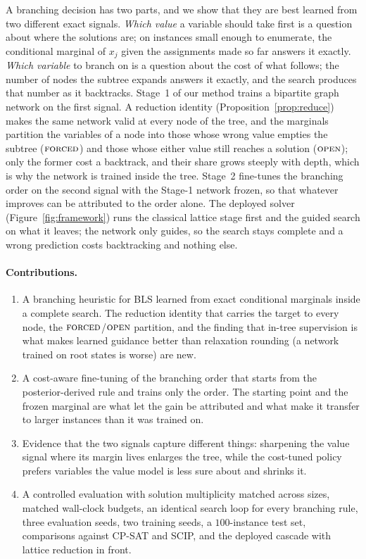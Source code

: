 \documentclass[final,5p,times,twocolumn,authoryear]{elsarticle}
\newcommand{\FORCED}{\textsc{forced}}
\newcommand{\FREE}{\textsc{open}}
\begin{document}
A branching decision has two parts, and we show that they are best learned from two different exact signals. \emph{Which value} a variable should take first is a question about where the solutions are; on instances small enough to enumerate, the conditional marginal of $x_j$ given the assignments made so far answers it exactly. \emph{Which variable} to branch on is a question about the cost of what follows; the number of nodes the subtree expands answers it exactly, and the search produces that number as it backtracks. Stage~1 of our method trains a bipartite graph network on the first signal. A reduction identity (Proposition~\ref{prop:reduce}) makes the same network valid at every node of the tree, and the marginals partition the variables of a node into those whose wrong value empties the subtree ($\FORCED$) and those whose either value still reaches a solution ($\FREE$); only the former cost a backtrack, and their share grows steeply with depth, which is why the network is trained inside the tree. Stage~2 fine-tunes the branching order on the second signal with the Stage-1 network frozen, so that whatever improves can be attributed to the order alone. The deployed solver (Figure~\ref{fig:framework}) runs the classical lattice stage first and the guided search on what it leaves; the network only guides, so the search stays complete and a wrong prediction costs backtracking and nothing else.

\paragraph{Contributions.}
\begin{enumerate}
\item A branching heuristic for BLS learned from exact conditional marginals inside a complete search. The reduction identity that carries the target to every node, the $\FORCED$/$\FREE$ partition, and the finding that in-tree supervision is what makes learned guidance better than relaxation rounding (a network trained on root states is worse) are new.
\item A cost-aware fine-tuning of the branching order that starts from the posterior-derived rule and trains only the order. The starting point and the frozen marginal are what let the gain be attributed and what make it transfer to larger instances than it was trained on.
\item Evidence that the two signals capture different things: sharpening the value signal where its margin lives enlarges the tree, while the cost-tuned policy prefers variables the value model is less sure about and shrinks it.
\item A controlled evaluation with solution multiplicity matched across sizes, matched wall-clock budgets, an identical search loop for every branching rule, three evaluation seeds, two training seeds, a $100$-instance test set, comparisons against CP-SAT and SCIP, and the deployed cascade with lattice reduction in front.
\end{enumerate}
\end{document}
